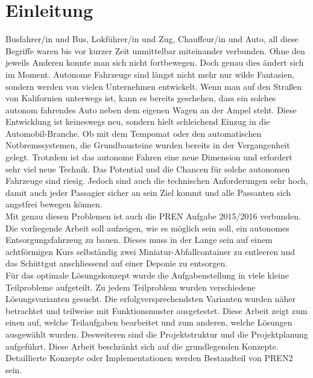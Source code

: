 \section{Einleitung}
Busfahrer/in und Bus, Lokführer/in und Zug, Chauffeur/in und Auto, all diese Begriffe waren bis vor kurzer Zeit unmittelbar miteinander verbunden. Ohne den jeweils Anderen konnte man sich nicht fortbewegen. Doch genau dies ändert sich im Moment. Autonome Fahrzeuge sind längst nicht mehr nur wilde Fantasien, sondern werden von vielen Unternehmen entwickelt. Wenn man auf den Straßen von Kalifornien unterwegs ist, kann es bereits geschehen, dass ein solches autonom fahrendes Auto neben dem eigenen Wagen an der Ampel steht. Diese Entwicklung ist keineswegs neu, sondern hielt schleichend Einzug in die Automobil-Branche. Ob mit dem Tempomat oder den automatischen Notbremssystemen, die Grundbausteine wurden bereits in der Vergangenheit gelegt.
Trotzdem ist das autonome Fahren eine neue Dimension und erfordert sehr viel neue Technik. Das Potential und die Chancen für solche autonomen Fahrzeuge sind riesig. Jedoch sind auch die technischen Anforderungen sehr hoch, damit auch jeder Passagier sicher an sein Ziel kommt und alle Passanten sich angstfrei bewegen können. \\
Mit genau diesen Problemen ist auch die PREN Aufgabe 2015/2016 verbunden. Die vorliegende Arbeit soll aufzeigen, wie es möglich sein soll, ein autonomes Entsorgungsfahrzeug zu bauen. Dieses muss in der Lange sein auf einem achtförmigen Kurs selbständig zwei Miniatur-Abfallcontainer zu entleeren und das Schüttgut anschliessend auf einer Deponie zu entsorgen.\\
Für das optimale Lösungskonzept wurde die Aufgabenstellung in viele kleine Teilprobleme aufgeteilt. Zu jedem Teilproblem wurden verschiedene Lösungsvarianten gesucht. Die erfolgversprechendsten Varianten wurden näher betrachtet und teilweise mit Funktionsmuster ausgetestet. Diese Arbeit zeigt zum einen auf, welche Teilaufgaben bearbeitet und zum anderen, welche Lösungen ausgewählt wurden. Desweiteren sind die Projektstruktur und die Projektplanung aufgeführt. Diese Arbeit beschränkt sich auf die grundlegenden Konzepte. Detaillierte Konzepte oder Implementationen werden Bestandteil von PREN2 sein. 
